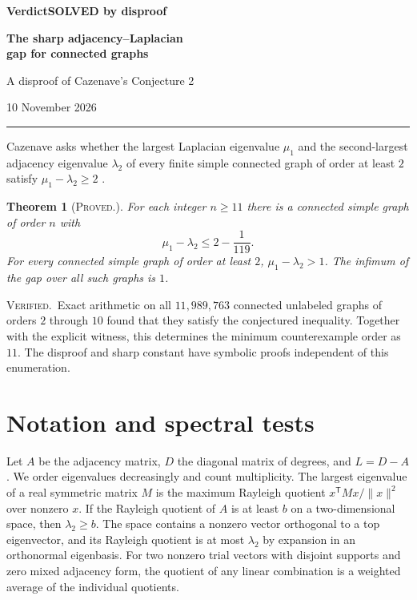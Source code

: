 \documentclass[11pt,a4paper]{article}
\newtheorem{theorem}{Theorem}
\newcommand{\gap}{\mu_1-\lambda_2}
\newcommand{\proved}{\textsc{Proved.}}
\newcommand{\verified}{\textsc{Verified.}}
\begin{document}
{\large\bfseries Verdict\quad SOLVED by disproof}\par
\vspace{7pt}
{\huge\bfseries The sharp adjacency--Laplacian\\[3pt]gap for connected graphs}\par
\vspace{6pt}
{\large A disproof of Cazenave's Conjecture 2}\par
{\small 10 November 2026}\par
\vspace{8pt}
\hrule
\vspace{8pt}

Cazenave asks whether the largest Laplacian eigenvalue $\mu_1$ and the second-largest adjacency eigenvalue $\lambda_2$ of every finite simple connected graph of order at least $2$ satisfy $\mu_1-\lambda_2\ge2$ \cite[\S7, Conjecture 2, corpus \#20829]{cazenave}.

\begin{theorem}[\proved]\label{thm:main}
For each integer $n\ge11$ there is a connected simple graph of order $n$ with
\[
\gap\le 2-\frac1{119}.
\]
For every connected simple graph of order at least $2$, $\gap>1$. The infimum of the gap over all such graphs is $1$.
\end{theorem}

\verified\ Exact arithmetic on all $11{,}989{,}763$ connected unlabeled graphs of orders $2$ through $10$ found that they satisfy the conjectured inequality. Together with the explicit witness, this determines the minimum counterexample order as $11$. The disproof and sharp constant have symbolic proofs independent of this enumeration.

\section{Notation and spectral tests}

Let $A$ be the adjacency matrix, $D$ the diagonal matrix of degrees, and $L=D-A$. We order eigenvalues decreasingly and count multiplicity. The largest eigenvalue of a real symmetric matrix $M$ is the maximum Rayleigh quotient $x^{\mathsf T}Mx/\|x\|^2$ over nonzero $x$. If the Rayleigh quotient of $A$ is at least $b$ on a two-dimensional space, then $\lambda_2\ge b$. The space contains a nonzero vector orthogonal to a top eigenvector, and its Rayleigh quotient is at most $\lambda_2$ by expansion in an orthonormal eigenbasis. For two nonzero trial vectors with disjoint supports and zero mixed adjacency form, the quotient of any linear combination is a weighted average of the individual quotients.
\end{document}
